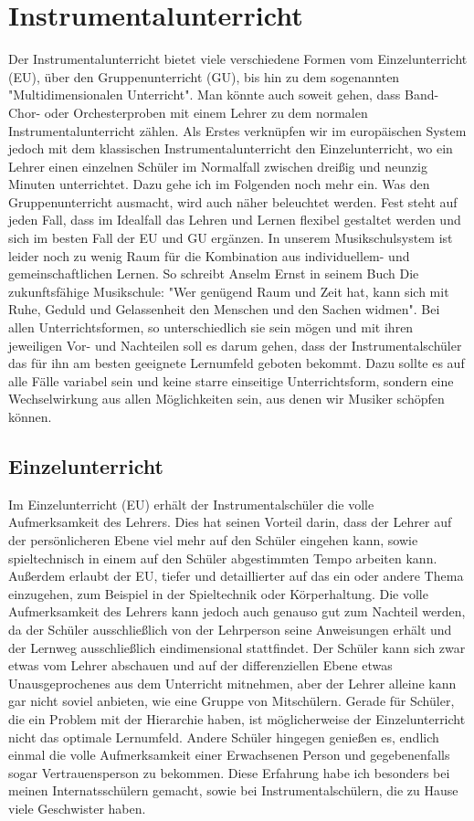 \section{Instrumentalunterricht}
Der Instrumentalunterricht bietet viele verschiedene Formen vom Einzelunterricht
(EU), über den Gruppenunterricht (GU), bis hin zu dem sogenannten
"Multidimensionalen Unterricht". Man könnte auch soweit gehen, dass Band- Chor-
oder Orchesterproben mit einem Lehrer zu dem normalen Instrumentalunterricht
zählen. Als Erstes verknüpfen wir im europäischen System jedoch mit dem
klassischen Instrumentalunterricht den Einzelunterricht, wo ein Lehrer einen
einzelnen Schüler im Normalfall zwischen dreißig und neunzig Minuten
unterrichtet. Dazu gehe ich im Folgenden noch mehr ein. Was den
Gruppenunterricht ausmacht, wird auch näher beleuchtet werden. Fest steht auf
jeden Fall, dass im Idealfall das Lehren und Lernen flexibel gestaltet werden
und sich im besten Fall der EU und GU ergänzen. In unserem Musikschulsystem ist
leider noch zu wenig Raum für die Kombination aus individuellem- und
gemeinschaftlichen Lernen. So schreibt Anselm Ernst in seinem Buch Die
zukunftsfähige Musikschule: "Wer genügend Raum und Zeit hat, kann sich mit Ruhe,
Geduld und Gelassenheit den Menschen und den Sachen widmen".
\autocite[84]{ernst:die_zukunftsfaehige_musikschule} Bei allen
Unterrichtsformen, so unterschiedlich sie sein mögen und mit ihren jeweiligen
Vor- und Nachteilen soll es darum gehen, dass der Instrumentalschüler das für
ihn am besten geeignete Lernumfeld geboten bekommt. Dazu sollte es auf alle
Fälle variabel sein und keine starre einseitige Unterrichtsform, sondern eine
Wechselwirkung aus allen Möglichkeiten sein, aus denen wir Musiker schöpfen können. 


\subsection{Einzelunterricht}
Im Einzelunterricht (EU) erhält der Instrumentalschüler die volle Aufmerksamkeit
des Lehrers. Dies hat seinen Vorteil darin, dass der Lehrer auf der
persönlicheren Ebene viel mehr auf den Schüler eingehen kann, sowie
spieltechnisch in einem auf den Schüler abgestimmten Tempo arbeiten kann.
Außerdem erlaubt der EU, tiefer und detaillierter auf das ein oder andere Thema
einzugehen, zum Beispiel in der Spieltechnik oder Körperhaltung. Die volle
Aufmerksamkeit des Lehrers kann jedoch auch genauso gut zum Nachteil werden, da
der Schüler ausschließlich von der Lehrperson seine Anweisungen erhält und der
Lernweg ausschließlich eindimensional stattfindet. Der Schüler kann sich zwar etwas vom Lehrer abschauen und auf der differenziellen Ebene etwas
Unausgeprochenes aus dem Unterricht mitnehmen, aber der Lehrer alleine kann gar
nicht soviel anbieten, wie eine Gruppe von Mitschülern. Gerade für Schüler, die
ein Problem mit der Hierarchie haben, ist möglicherweise der Einzelunterricht
nicht das optimale Lernumfeld. Andere Schüler hingegen genießen es, endlich
einmal die volle Aufmerksamkeit einer Erwachsenen Person und gegebenenfalls
sogar Vertrauensperson zu bekommen. Diese Erfahrung habe ich besonders bei
meinen Internatsschülern gemacht, sowie bei Instrumentalschülern, die zu Hause
viele Geschwister haben. 

